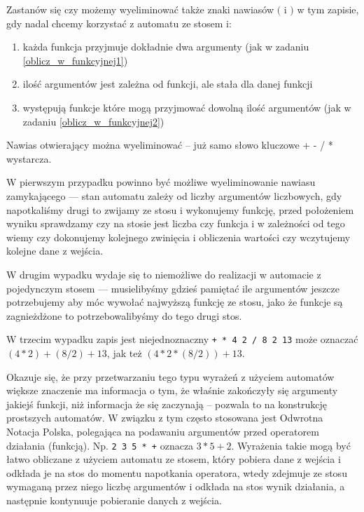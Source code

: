 \documentclass{pdfBooklets}
\begin{document}
\begin{Zadanie}{}{}
Zastanów się czy możemy wyeliminować także znaki nawiasów $($ i $)$ w tym zapisie, gdy nadal chcemy korzystać z automatu ze stosem i:
\begin{enumerate}
\item każda funkcja przyjmuje dokładnie dwa argumenty (jak w zadaniu \ref{oblicz_w_funkcyjnej1})
\item ilość argumentów jest zależna od funkcji, ale stała dla danej funkcji
\item występują funkcje które mogą przyjmować dowolną ilość argumentów (jak w zadaniu \ref{oblicz_w_funkcyjnej2})
\end{enumerate}

\begin{teacherOnly}
Nawias otwierający można wyeliminować – już samo słowo kluczowe + - / * wystarcza.

W pierwszym przypadku powinno być możliwe wyeliminowanie nawiasu zamykającego --- stan automatu zależy od liczby argumentów liczbowych, gdy napotkaliśmy drugi to zwijamy ze stosu i wykonujemy funkcję, przed położeniem wyniku sprawdzamy czy na stosie jest liczba czy funkcja i w zależności od tego wiemy czy dokonujemy kolejnego zwinięcia i obliczenia wartości czy wczytujemy kolejne dane z wejścia.

W drugim wypadku wydaje się to niemożliwe do realizacji w automacie z pojedynczym stosem --- musielibyśmy gdzieś pamiętać ile argumentów jeszcze potrzebujemy aby móc wywołać najwyższą funkcję ze stosu, jako że funkcje są zagnieżdżone to potrzebowalibyśmy do tego drugi stos.

W trzecim wypadku zapis jest niejednoznaczny {\tt + * 4 2 / 8 2 13} może oznaczać  $(4 * 2) + (8 / 2) + 13$, jak też $(4 * 2 * (8 / 2)) + 13$.

\end{teacherOnly}
\end{Zadanie}

Okazuje się, że przy przetwarzaniu tego typu wyrażeń z użyciem automatów większe znaczenie ma informacja o tym, że właśnie zakończyły się argumenty jakiejś funkcji, niż informacja że się zaczynają – pozwala to na konstrukcję prostszych automatów.
W związku z tym często stosowana jest Odwrotna Notacja Polska, polegająca na podawaniu argumentów przed operatorem działania (funkcją). Np. {\tt 2 3 5 * +} oznacza $3*5 + 2$. Wyrażenia takie mogą być łatwo obliczane z użyciem automatu ze stosem, który pobiera dane z wejścia i odkłada je na stos do momentu napotkania operatora, wtedy zdejmuje ze stosu wymaganą przez niego liczbę argumentów i odkłada na stos wynik działania, a następnie kontynuuje pobieranie danych z wejścia.
\end{document}
